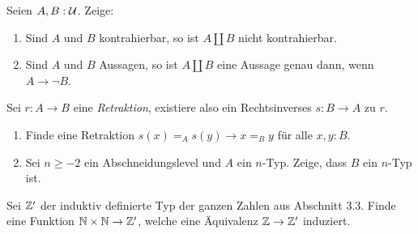 \documentclass{uebung}
\begin{document}

\begin{exercise}
  Seien $A,B:\mathcal{U}$.
  Zeige:
  \begin{enumerate}
    \item Sind $A$ und $B$ kontrahierbar, so ist $A \amalg B$ nicht kontrahierbar.
    \item Sind $A$ und $B$ Aussagen, so ist $A \amalg B$ eine Aussage genau dann, wenn $A \to \neg B$.
  \end{enumerate}
\end{exercise}

\begin{exercise}
  Sei $r:A \to B$ eine \emph{Retraktion}, existiere also ein Rechtsinverses $s:B \to A$ zu $r$.
  \begin{enumerate}
    \item Finde eine Retraktion $s(x) =_A s(y) \to x=_B y$ für alle $x,y:B$.
    \item Sei $n\geq -2$ ein Abschneidungslevel und $A$ ein $n$-Typ.
      Zeige, dass $B$ ein $n$-Typ ist.
  \end{enumerate}
\end{exercise}

\begin{exercise}
  Sei $\mathbb{Z}'$ der induktiv definierte Typ der ganzen Zahlen aus Abschnitt 3.3.
  Finde eine Funktion $\mathbb{N}\times \mathbb{N}\to\mathbb{Z}'$, welche eine Äquivalenz $\mathbb{Z}\to\mathbb{Z}'$ induziert.
\end{exercise}
\end{document}
